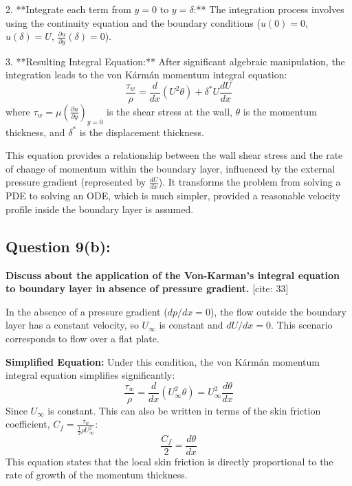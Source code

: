 \documentclass{article}
\begin{document}
2.  **Integrate each term from $y=0$ to $y=\delta$:**
    The integration process involves using the continuity equation and the boundary conditions ($u(0)=0$, $u(\delta)=U$, $\frac{\partial u}{\partial y}(\delta) = 0$).

3.  **Resulting Integral Equation:**
    After significant algebraic manipulation, the integration leads to the von Kármán momentum integral equation:
    $$ \frac{\tau_w}{\rho} = \frac{d}{dx}(U^2\theta) + \delta^* U \frac{dU}{dx} $$
    where $\tau_w = \mu (\frac{\partial u}{\partial y})_{y=0}$ is the shear stress at the wall, $\theta$ is the momentum thickness, and $\delta^*$ is the displacement thickness.

This equation provides a relationship between the wall shear stress and the rate of change of momentum within the boundary layer, influenced by the external pressure gradient (represented by $\frac{dU}{dx}$). It transforms the problem from solving a PDE to solving an ODE, which is much simpler, provided a reasonable velocity profile inside the boundary layer is assumed.
\hrulefill

\subsection*{\textbf{Question 9(b):}}
\textbf{Discuss about the application of the Von-Karman's integral equation to boundary layer in absence of pressure gradient.} [cite: 33]

In the absence of a pressure gradient ($dp/dx = 0$), the flow outside the boundary layer has a constant velocity, so $U_\infty$ is constant and $dU/dx = 0$. This scenario corresponds to flow over a flat plate.

\textbf{Simplified Equation:}
Under this condition, the von Kármán momentum integral equation simplifies significantly:
$$ \frac{\tau_w}{\rho} = \frac{d}{dx}(U_\infty^2\theta) = U_\infty^2 \frac{d\theta}{dx} $$
Since $U_\infty$ is constant. This can also be written in terms of the skin friction coefficient, $C_f = \frac{\tau_w}{\frac{1}{2}\rho U_\infty^2}$:
$$ \frac{C_f}{2} = \frac{d\theta}{dx} $$
This equation states that the local skin friction is directly proportional to the rate of growth of the momentum thickness.
\end{document}
